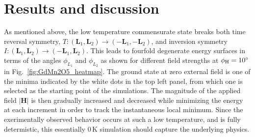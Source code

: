 \section{Results and discussion}

As mentioned above, the low temperature commensurate state breaks both time reversal symmetry, $T: (\bm{L}_1, \bm{L}_2) \rightarrow (-\bm{L}_1, -\bm{L}_2)$, and inversion symmetry $I:(\bm{L}_1, \bm{L}_2) \rightarrow (-\bm{L}_1, \bm{L}_2)$.
This leads to fourfold degenerate energy surfaces in terms of the angles $\phi_{L_1}$ and $\phi_{L_2}$ as shown for different field strengths at $\phi_{\rm H} = 10^\circ$ in Fig.~\ref{fig:GdMn2O5_heatmap}.
The ground state at zero external field is one of the minima indicated by the white dots in the top left panel, from which one is selected as the starting point of the simulations.
The magnitude of the applied field $|\bm{H}|$ is then gradually increased and decreased while minimizing the energy at each increment in order to track the instantaneous local minimum.
Since the exerimentally observed behavior occurs at such a low temperature, and is fully determistic, this essentially 0\,K simulation should capture the underlying physics.

\begin{figure*}[h]
	\begin{subfigure}{0.24\textwidth}
	\end{subfigure}
	\begin{subfigure}{0.24\textwidth}
	\end{subfigure}
	\begin{subfigure}{0.24\textwidth}
	\end{subfigure}
	\begin{subfigure}{0.24\textwidth}
	\end{subfigure}\\
	\begin{subfigure}{0.24\textwidth}
	\end{subfigure}
	\begin{subfigure}{0.24\textwidth}
	\end{subfigure}
	\begin{subfigure}{0.24\textwidth}
	\end{subfigure}
	\begin{subfigure}{0.24\textwidth}
	\end{subfigure}
	\caption{{\bf Energy Surfaces.} The evolution of the energy surface during field sweep at +10$^\circ$ is displayed, with the white dots in the top left panel denoting the four degenerate minima. If the field would be applied along -10$^\circ$, horizontal gutters would form.\label{fig:GdMn2O5_heatmap}}
\end{figure*}

